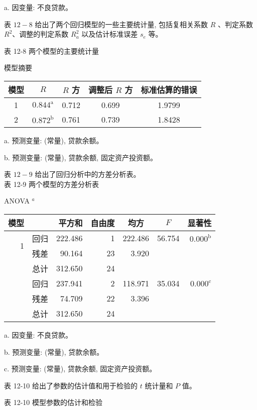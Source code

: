 \documentclass[10pt]{article}
\begin{document}
\begin{CJK*}{UTF8}{bsmi}
a. 因变量: 不良贷款。

表 $12-8$ 给出了两个回归模型的一些主要统计量, 包括复相关系数 $R$ 、判定系数 $R^{2} 、$调整的判定系数 $R_{a}^{2}$ 以及估计标准误差 $s_{e}$ 等。

表 12-8 两个模型的主要统计量

模型摘要

\begin{center}
\begin{tabular}{ccccc}
\hline
模型 & $R$ & $R$ 方 & 调整后 $R$ 方 & 标准估算的错误 \\
\hline
1 & $0.844^{\mathrm{a}}$ & 0.712 & 0.699 & 1.9799 \\
2 & $0.872^{\mathrm{b}}$ & 0.761 & 0.739 & 1.8428 \\
\hline
\end{tabular}
\end{center}

a. 预测变量: (常量), 贷款余额。

b. 预测变量: (常量), 贷款余额, 固定资产投资额。

表 $12-9$ 给出了回归分析中的方差分析表。\\
表 12-9 两个模型的方差分析表

ANOVA $^{a}$

\begin{center}
\begin{tabular}{rrrrrrr}
\hline
模型 &  & 平方和 & 自由度 & \multicolumn{1}{c}{均方} & \multicolumn{1}{c}{$F$} & 显著性 \\
\hline
\multirow{2}{*}{1} & 回归 & 222.486 & 1 & 222.486 & 56.754 & $0.000^{\mathrm{b}}$ \\
 & 残差 & 90.164 & 23 & 3.920 &  &  \\
 & 总计 & 312.650 & 24 &  &  &  \\
 & 回归 & 237.941 & 2 & 118.971 & 35.034 & $0.000^{\mathrm{c}}$ \\
 & 残差 & 74.709 & 22 & 3.396 &  &  \\
 & 总计 & 312.650 & 24 &  &  &  \\
\hline
\end{tabular}
\end{center}

a. 因变量: 不良贷款。

b. 预测变量: (常量), 贷款余额。

c. 预测变量: (常量), 贷款余额, 固定资产投资额。

表 12-10 给出了参数的估计值和用于检验的 $t$ 统计量和 $P$ 值。

表 12-10 模型参数的估计和检验


\end{CJK*}
\end{document}
